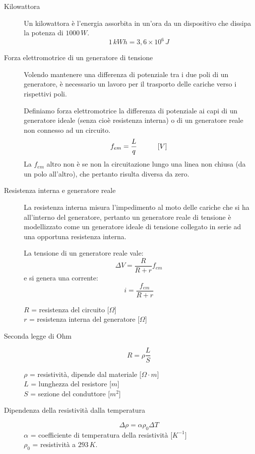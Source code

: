 \documentclass[a4paper,11pt,italian]{article}
\begin{document}
\begin{description}
  \item[Kilowattora] 
  Un kilowattora è l’energia assorbita in un'ora da un dispositivo che dissipa la potenza di $ 1000 \, W $.
  \[ 1 \, kWh = 3,6 \times 10^6 \, J \]
  
  \item[Forza elettromotrice di un generatore di tensione] 
  Volendo mantenere una differenza di potenziale tra i due poli di un generatore, è necessario un lavoro per il trasporto delle cariche verso i rispettivi poli.
  
  Definiamo forza elettromotrice la differenza di potenziale ai capi di un generatore ideale (senza cioè resistenza interna) o di un generatore reale non connesso ad un circuito.
  \[ f_{em} = \frac{L}{q} \hspace*{3em} [V] \]
  La $ f_{em} $ altro non è se non la circuitazione lungo una linea non chiusa (da un polo all'altro), che pertanto risulta diversa da zero.
  
  \item[Resistenza interna e generatore reale] 
  La resistenza interna misura l’impedimento al moto delle cariche che si ha all’interno del generatore, pertanto un generatore reale di tensione è modellizzato come un generatore ideale di tensione collegato in serie ad una opportuna resistenza interna.
  
  La tensione di un generatore reale vale:
  \[ \Delta V = \frac{R}{R+r} f_{em} \]
  e si genera una corrente:
  \[ i = \frac{f_{em}}{R+r} \]
  \begin{multicols}{2}
  $ R $ = resistenza del circuito [$ \Omega $]\\
  $ r $ = resistenza interna del generatore [$ \Omega $]
  \end{multicols}
  
  \item[Seconda legge di Ohm] 
  \[ R = \rho \frac{L}{S} \]
  \begin{multicols}{2}
  $ \rho $ = resistività, dipende dal materiale [$ \Omega \cdot m $]\\
  $ L $ = lunghezza del resistore [$ m $]\\
  $ S $ = sezione del conduttore [$ m^2 $]
  \end{multicols}
  
  \item[Dipendenza della resistività dalla temperatura]
  \[ \Delta \rho = \alpha \rho_0 \Delta T  \]
  $ \alpha $ = coefficiente di temperatura della resistività [$ K^{-1} $]\\
  $ \rho_0 $ = resistività a $ 293 \, K $.
  

\end{description}
\end{document}
